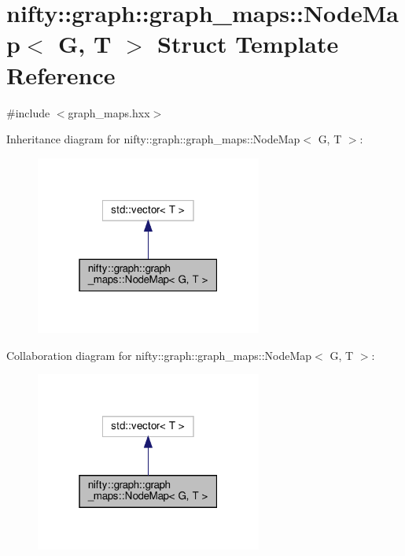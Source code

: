 \hypertarget{structnifty_1_1graph_1_1graph__maps_1_1NodeMap}{}\section{nifty\+:\+:graph\+:\+:graph\+\_\+maps\+:\+:Node\+Map$<$ G, T $>$ Struct Template Reference}
\label{structnifty_1_1graph_1_1graph__maps_1_1NodeMap}


{\ttfamily \#include $<$graph\+\_\+maps.\+hxx$>$}



Inheritance diagram for nifty\+:\+:graph\+:\+:graph\+\_\+maps\+:\+:Node\+Map$<$ G, T $>$\+:
\nopagebreak
\begin{figure}[H]
\begin{center}
\leavevmode
\includegraphics[width=211pt]{structnifty_1_1graph_1_1graph__maps_1_1NodeMap__inherit__graph}
\end{center}
\end{figure}


Collaboration diagram for nifty\+:\+:graph\+:\+:graph\+\_\+maps\+:\+:Node\+Map$<$ G, T $>$\+:
\nopagebreak
\begin{figure}[H]
\begin{center}
\leavevmode
\includegraphics[width=211pt]{structnifty_1_1graph_1_1graph__maps_1_1NodeMap__coll__graph}
\end{center}
\end{figure}
